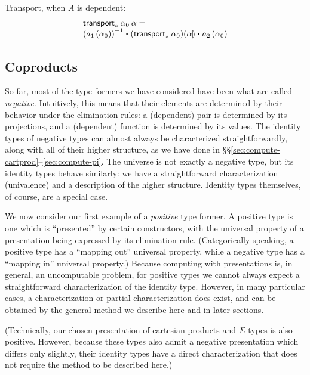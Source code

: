 Transport, when $A$ is dependent:
\[
\begin{array}{l}
\transport{x_0:A_0 \mapsto \id[A(x_0)] {a_1(x_0)}{a_2(x_0)}} {\alpha_0} \: {\alpha} = \\
\opp{(\map{a_1}{\alpha_0})} \ct \mapdep{(\transport{A}{\alpha_0})}{\alpha} \ct \map{a_2}{\alpha_0}
\end{array}
\]

\subsection{Coproducts}
\label{sec:compute-coprod}

So far, most of the type formers we have considered have been what are called \emph{negative}.
Intuitively, this means that their elements are determined by their behavior under the elimination rules: a (dependent) pair is determined by its projections, and a (dependent) function is determined by its values.
The identity types of negative types can almost always be characterized straightforwardly, along with all of their higher structure, as we have done in \S\S\ref{sec:compute-cartprod}--\ref{sec:compute-pi}.
The universe is not exactly a negative type, but its identity types behave similarly: we have a straightforward characterization (univalence) and a description of the higher structure.
Identity types themselves, of course, are a special case.

We now consider our first example of a \emph{positive} type former.
A positive type is one which is ``presented'' by certain constructors, with the universal property of a presentation being expressed by its elimination rule.
(Categorically speaking, a positive type has a ``mapping out'' universal property, while a negative type has a ``mapping in'' universal property.)
Because computing with presentations is, in general, an uncomputable problem, for positive types we cannot always expect a straightforward characterization of the identity type.
However, in many particular cases, a characterization or partial characterization does exist, and can be obtained by the general method we describe here and in later sections.

(Technically, our chosen presentation of cartesian products and $\Sigma$-types is also positive.
However, because these types also admit a negative presentation which differs only slightly, their identity types have a direct characterization that does not require the method to be described here.)

